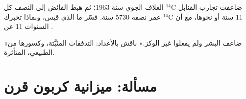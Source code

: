 \begin{exercise}[$\star\star\star$]\label{exo:b2:biogeochemical-cycles:11}
ضاعفت تجارب القنابل $\mathrm{{}^{14}C}$ الغلاف الجوي سنة 1963؛ ثم هبط
الفائض إلى النصف كل 11 سنة أو نحوها، مع أن $\mathrm{{}^{14}C}$
عمر نصفه 5730 سنة. فسّر ما الذي قيس، وبماذا
تخبرك السنوات 11 عن .
\end{exercise}

\begin{exercise}[$\star\star\star$]\label{exo:b2:biogeochemical-cycles:12}
«ضاعف البشر  ولم يفعلوا  غير
الوكز.» ناقش بالأعداد: التدفقات المثبَّتة، وكسورها من
 الطبيعي،  المتأثرة.
\end{exercise}

\section{مسألة: ميزانية كربون قرن}

